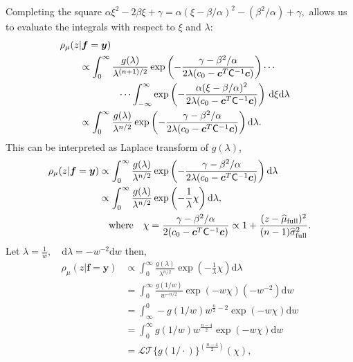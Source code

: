 \documentclass{iitthesis}          %
\newcommand{\bm}[1]{\boldsymbol{#1}}
\newcommand{\dif}[1]{\text{d}{#1}}
\newcommand{\D}[1]{\text{d}{#1}}
\newcommand{\vc}{\bm{c}}
\newcommand{\vf}{\bm{f}}
\newcommand{\vy}{\bm{y}}
\newcommand{\mC}{\mathsf{C}}
\newcommand{\hmu}{\widehat{\mu}}
\begin{document}
Completing the square $
\alpha \xi^2 -2 \beta \xi + \gamma 
= \alpha (\xi -\beta/\alpha)^2  - (\beta^2/\alpha) + \gamma,
$
allows us to evaluate the integrals with respect to $\xi$ and $\lambda$:
\begin{align*}
\MoveEqLeft{\rho_{\mu}(z | \vf = \vy)} &
\\
& \propto \displaystyle \int_{0}^\infty  \frac{g(\lambda)}{\lambda^{(n+1)/2}}  \exp\left( -\frac{  \gamma - \beta^2/\alpha}{2\lambda(c_0  -\vc ^T \mC^{-1} \vc)} \right)  \cdots 
\\
& \qquad \qquad \cdots \int_{-\infty}^\infty  \exp\left( -\frac{\alpha (\xi -\beta/\alpha)^2}{2\lambda(c_0  -\vc ^T \mC^{-1} \vc)} \right) \, \D \xi \D \lambda 
\\
& \propto \displaystyle \int_{0}^\infty  \frac{g(\lambda)}{\lambda^{n/2}}  \exp\left( -\frac{  \gamma - \beta^2/\alpha}{2\lambda(c_0  -\vc ^T \mC^{-1} \vc)} \right) \D \lambda 
.
\end{align*}
This can be interpreted as Laplace transform of $g(\lambda)$,
\begin{align*}
{\rho_{\mu}(z | \vf = \vy)} 
& \propto \displaystyle \int_{0}^\infty  \frac{g(\lambda)}{\lambda^{n/2}}  \exp\left( -\frac{  \gamma - \beta^2/\alpha}{2\lambda(c_0  -\vc ^T \mC^{-1} \vc)} \right) \D \lambda 
\\
& \propto \int_{0}^\infty \frac{g(\lambda)}{\lambda^{n/2}}
\exp \left(  - \frac{1}{\lambda} \chi \right)
\dif{\lambda}, 
\\
& \quad \text{where} \quad \chi = \frac{  \gamma - \beta^2/\alpha}{2(c_0  -\vc ^T \mC^{-1} \vc)} 
\propto { 1 +  \frac{(z - \hmu_{\textup{full}})^2}{(n-1)\widehat{\sigma}_{\textup{full}}^2} }.
\end{align*}
Let $\displaystyle \lambda = \frac{1}{w}, \quad \dif{\lambda} = -w^{-2} \dif{w}$ then,
\begin{align*}
{\rho_{\mu}(z | \vf = \vy)} 
& \propto \int_{0}^\infty \frac{g(\lambda)}{\lambda^{n/2}}
\exp \left(  - \frac{1}{\lambda} \chi \right)
\dif{\lambda} 
\\
&= \int_{0}^\infty \frac{g(1/w)  }{w^{-n/2}}
\exp \left(  - w \chi \right)
(-w^{-2})\dif{w}
\\
&= \int_\infty^0 -g(1/w) w^{\frac n2 - 2}
\exp \left(  - w \chi \right)
\D{w}
\\
&= \int_0^\infty g(1/w) w^{\frac{n-4}2}
\exp \left(  - w \chi \right)
\D{w}
\\
& = \mathcal{LT} \{ g(1/\cdot) \}^{(\frac{n-4}2)}\left(\chi\right),
\end{align*}
\end{document}
